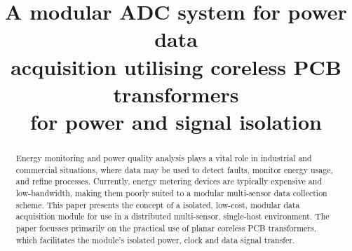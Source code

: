 \documentclass[conference]{IEEEtran}
\begin{document}
%
\title{A modular ADC system for power data \\acquisition utilising coreless PCB transformers \\for power and signal isolation}


\author{
}





\maketitle

\begin{abstract}
Energy monitoring and power quality analysis plays a vital role in industrial and commercial situations, where data may be used to detect faults, monitor energy usage, and refine processes.  Currently, energy metering devices are typically expensive and low-bandwidth, making them poorly suited to a modular multi-sensor data collection scheme.  This paper presents the concept of a isolated, low-cost, modular data acquisition module for use in a distributed multi-sensor, single-host environment.  The paper focusses primarily on the practical use of planar coreless PCB transformers, which facilitates the module's isolated power, clock and data signal transfer.
\end{abstract}


\IEEEpeerreviewmaketitle
\end{document}
